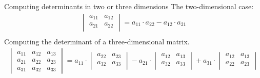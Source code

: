 \documentclass[notes]{beamer}
\begin{document}
    \begin{frame}{Computing determinants in two or three dimensions}
      The two-dimensional case:
      \begin{align}
        \begin{vmatrix}
          a_{11} & a_{12} \\
          a_{21} & a_{22} \\
        \end{vmatrix}
        = a_{11} \cdot a_{22} - a_{12} \cdot a_{21} \\
      \end{align}
      Computing the determinant of a three-dimensional matrix.
      \begin{align}
        \begin{vmatrix}
          a_{11} & a_{12} & a_{13}  \\
          a_{21} & a_{22} & a_{23}  \\
          a_{31} & a_{32} & a_{33}
        \end{vmatrix}
        = a_{11} \cdot
         \begin{vmatrix}
          a_{22} & a_{23}   \\
          a_{32} & a_{33}   \\
         \end{vmatrix}  
         -
         a_{21} \cdot
         \begin{vmatrix}
          a_{12} & a_{13}   \\
          a_{32} & a_{33}   \\
         \end{vmatrix}  
        +
         a_{31} \cdot
         \begin{vmatrix}
          a_{12} & a_{13}   \\
          a_{22} & a_{23}   \\
         \end{vmatrix}  
      \end{align}
\end{frame}
\end{document}
